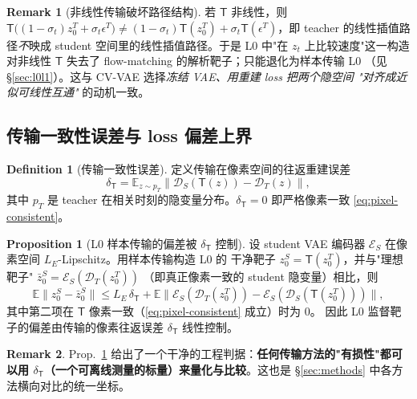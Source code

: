 \documentclass[11pt,a4paper]{article}
\newcommand{\E}{\mathbb{E}}
\newcommand{\Enc}{\mathcal{E}}
\newcommand{\Dec}{\mathcal{D}}
\newcommand{\Tmap}{\mathsf{T}}
\theoremstyle{definition}
\newtheorem{definition}{Definition}
\newtheorem{remark}{Remark}
\newtheorem{proposition}{Proposition}
\begin{document}
\begin{remark}[非线性传输破坏路径结构]
\label{rem:nonlinear-break}
若 $\Tmap$ 非线性，则 $\Tmap\big((1-\sigma_t)z_0^T+\sigma_t\epsilon^T\big)\neq
(1-\sigma_t)\Tmap(z_0^T)+\sigma_t\Tmap(\epsilon^T)$，即 teacher 的线性插值路径\emph{不}映成
student 空间里的线性插值路径。于是 L0 中"在 $z_t$ 上比较速度"这一构造对非线性
$\Tmap$ 失去了 flow-matching 的解析靶子；只能退化为样本传输 L0
（见 \S\ref{sec:l0l1}）。这与 CV-VAE 选择\emph{冻结 VAE、用重建 loss 把两个隐空间
"对齐成近似可线性互通"} 的动机一致。
\end{remark}

\subsection{传输一致性误差与 loss 偏差上界}

\begin{definition}[传输一致性误差]
\label{def:delta}
定义传输在像素空间的往返重建误差
\begin{equation}
\delta_{\Tmap}
=\E_{z\sim p_T}\big\lVert \Dec_S(\Tmap(z))-\Dec_T(z)\big\rVert,
\label{eq:delta}
\end{equation}
其中 $p_T$ 是 teacher 在相关时刻的隐变量分布。$\delta_{\Tmap}=0$ 即严格像素一致
\eqref{eq:pixel-consistent}。
\end{definition}

\begin{proposition}[L0 样本传输的偏差被 $\delta_{\Tmap}$ 控制]
\label{prop:bound}
设 student VAE 编码器 $\Enc_S$ 在像素空间 $L_E$-Lipschitz。用样本传输构造 L0 的
干净靶子 $z_0^S=\Tmap(z_0^T)$，并与"理想靶子" $\bar z_0^S=\Enc_S(\Dec_T(z_0^T))$
（即真正像素一致的 student 隐变量）相比，则
\begin{equation}
\E\big\lVert z_0^S-\bar z_0^S\big\rVert
\le L_E\,\delta_{\Tmap}
+\E\big\lVert \Enc_S(\Dec_T(z_0^T))-\Enc_S(\Dec_S(\Tmap(z_0^T)))\big\rVert,
\end{equation}
其中第二项在 $\Tmap$ 像素一致（\eqref{eq:pixel-consistent} 成立）时为 $0$。
因此 L0 监督靶子的偏差由传输的像素往返误差 $\delta_{\Tmap}$ 线性控制。
\end{proposition}

\begin{remark}
Prop.~\ref{prop:bound} 给出了一个干净的工程判据：\textbf{任何传输方法的"有损性"都可
以用 $\delta_{\Tmap}$（一个可离线测量的标量）来量化与比较}。这也是
\S\ref{sec:methods} 中各方法横向对比的统一坐标。
\end{remark}

\end{document}
